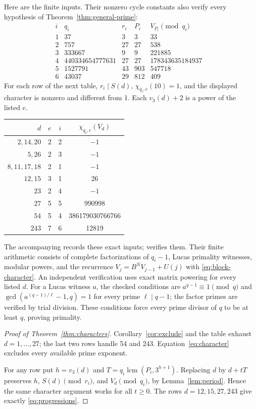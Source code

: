 \documentclass[10pt]{article}
\begin{document}
Here are the finite inputs. Their nonzero cycle constants also verify every
hypothesis of Theorem~\ref{thm:general-prime}:
\[
\begin{array}{c|r|r|r|r}
 i&q_i&r_i&P_i&V_{P_i}\pmod{q_i}\\\hline
 1&37&3&3&33\\
 2&757&27&27&538\\
 3&333667&9&9&221885\\
 4&440334654777631&27&27&178343635184937\\
 5&1527791&43&903&547718\\
 6&43037&29&812&409
\end{array}
\]
For each row of the next table, $r_i\mid S(d)$,
$\chi_{q_i,e}(10)=1$, and the displayed character is nonzero and different
from 1. Each $v_3(d)+2$ is a power of the listed $e$.
\begin{center}
\begin{tabular}{rccc}
\toprule
$d$&$e$&$i$&$\chi_{q_i,e}(V_d)$\\\midrule
$2,14,20$&2&2&$-1$\\
$5,26$&2&3&$-1$\\
$8,11,17,18$&2&1&$-1$\\
$12,15$&3&1&26\\
$23$&2&4&$-1$\\
$27$&5&5&990998\\
$54$&5&4&386179030766766\\
$243$&7&6&12819\\
\bottomrule
\end{tabular}
\end{center}
The accompanying  records these exact inputs;
 verifies them.
Their finite arithmetic consists of complete factorizations of $q_i-1$,
Lucas primality witnesses, modular powers, and the recurrence
$V_j=B^NV_{j-1}+U(j)$ with \eqref{eq:block-character}.
An independent verification uses exact matrix powering for every listed $d$.
For a Lucas witness $a$, the checked conditions are
$a^{q-1}\equiv1\pmod q$ and
$\gcd(a^{(q-1)/\ell}-1,q)=1$ for every prime $\ell\mid q-1$;
the factor primes are verified by trial division.
These conditions force every prime divisor of $q$ to be at least $q$,
proving primality.

\begin{proof}[Proof of Theorem~\ref{thm:characters}]
Corollary~\ref{cor:exclude} and the table exhaust $d=1,\ldots,27$;
the last two rows handle 54 and 243. Equation~\eqref{eq:character}
excludes every available prime exponent.

For any row put $h=v_3(d)$ and
$T=q_i\operatorname{lcm}(P_i,3^{h+1})$.
Replacing $d$ by $d+tT$ preserves $h$, $S(d)\pmod{r_i}$, and
$V_d\pmod{q_i}$, by Lemma~\ref{lem:period}.
Hence the same character argument works for all $t\ge0$.
The rows $d=12,15,27,243$ give exactly \eqref{eq:progressions}.
\end{proof}
\end{document}
